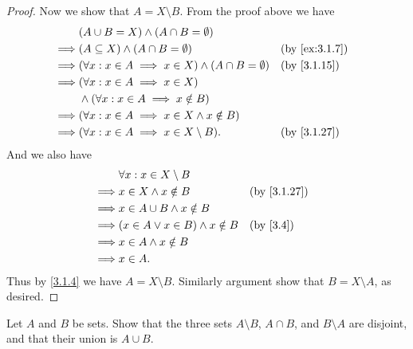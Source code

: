 \begin{proof}
  Now we show that \(A = X \setminus B\).
  From the proof above we have
  \begin{align*}
             & (A \cup B = X) \land (A \cap B = \emptyset)                                                          \\
    \implies & (A \subseteq X) \land (A \cap B = \emptyset)                        &  & \text{(by \cref{ex:3.1.7})} \\
    \implies & (\forall x : x \in A \implies x \in X) \land (A \cap B = \emptyset) &  & \text{(by \cref{3.1.15})}   \\
    \implies & (\forall x : x \in A \implies x \in X)                                                               \\
             & \land (\forall x : x \in A \implies x \notin B)                                                      \\
    \implies & (\forall x : x \in A \implies x \in X \land x \notin B)                                              \\
    \implies & (\forall x : x \in A \implies x \in X \setminus B).                 &  & \text{(by \cref{3.1.27})}
  \end{align*}
  And we also have
  \begin{align*}
             & \forall x : x \in X \setminus B                                        \\
    \implies & x \in X \land x \notin B                &  & \text{(by \cref{3.1.27})} \\
    \implies & x \in A \cup B \land x \notin B                                        \\
    \implies & (x \in A \lor x \in B) \land x \notin B &  & \text{(by \cref{3.4})}    \\
    \implies & x \in A \land x \notin B                                               \\
    \implies & x \in A.
  \end{align*}
  Thus by \cref{3.1.4} we have \(A = X \setminus B\).
  Similarly argument show that \(B = X \setminus A\), as desired.
\end{proof}

\begin{ex}\label{ex:3.1.10}
  Let \(A\) and \(B\) be sets.
  Show that the three sets \(A \setminus B\), \(A \cap B\), and \(B \setminus A\) are disjoint, and that their union is \(A \cup B\).
\end{ex}

